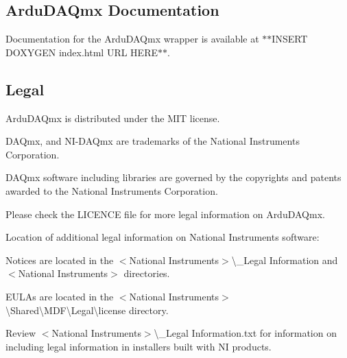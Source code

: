 \subsection*{Ardu\+D\+A\+Qmx Documentation}

Documentation for the Ardu\+D\+A\+Qmx wrapper is available at $\ast$$\ast${\ttfamily I\+N\+S\+E\+RT D\+O\+X\+Y\+G\+EN index.\+html U\+RL H\+E\+RE}$\ast$$\ast$.

\subsection*{Legal}

Ardu\+D\+A\+Qmx is distributed under the M\+IT license.

D\+A\+Qmx, and N\+I-\/\+D\+A\+Qmx are trademarks of the National Instruments Corporation.

D\+A\+Qmx software including libraries are governed by the copyrights and patents awarded to the National Instruments Corporation.

Please check the {\ttfamily L\+I\+C\+E\+N\+CE} file for more legal information on Ardu\+D\+A\+Qmx.

Location of additional legal information on National Instruments software\+:
\begin{DoxyItemize}
\item Notices are located in the {\ttfamily $<$National Instruments$>$\textbackslash{}\+\_\+\+Legal Information and $<$National Instruments$>$} directories.
\item E\+U\+L\+As are located in the {\ttfamily $<$National Instruments$>$\textbackslash{}Shared\textbackslash{}M\+DF\textbackslash{}Legal\textbackslash{}license} directory.
\item Review {\ttfamily $<$National Instruments$>$\textbackslash{}\+\_\+\+Legal Information.\+txt} for information on including legal information in installers built with NI products. 
\end{DoxyItemize}